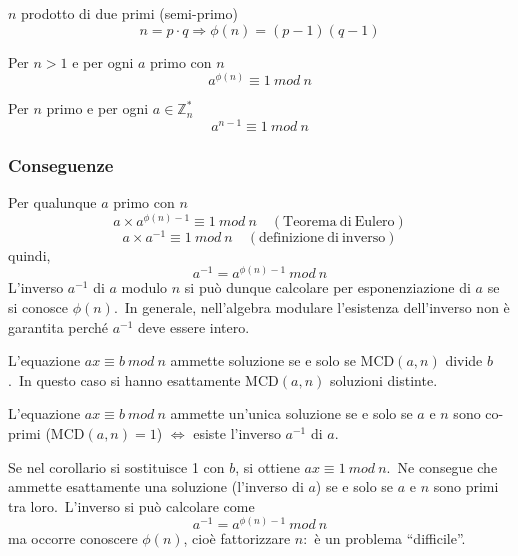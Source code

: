 \begin{theorem}
    $n$ prodotto di due primi (semi-primo)
    \[n = p\cdot q \Rightarrow \phi(n) = (p-1)(q-1)\]
\end{theorem}

\begin{theorem}[Eulero]
    Per $n>1$ e per ogni $a$ primo con $n$
    \[a^{\phi(n)} \equiv 1\ \mathit{mod}\ n\]
\end{theorem}

\begin{theorem}[Fermat]
    Per $n$ primo e per ogni $a \in \mathbb{Z}_n^*$
    \[a^{n-1} \equiv 1\ \mathit{mod}\ n\]
\end{theorem}

\subsubsection{Conseguenze}

Per qualunque $a$ primo con $n$
\[a \times a^{\phi(n)-1}\equiv 1\ \mathit{mod}\ n \quad (\mathrm{Teorema\ di\ Eulero})\]
\[a \times a^{-1}\equiv 1\ \mathit{mod}\ n \quad (\mathrm{definizione\ di\ inverso})\]
quindi,
\[a^{-1} = a^{\phi(n)-1}\ \mathit{mod}\ n \]
L'inverso $a^{-1}$ di $a$ modulo $n$ si può dunque calcolare per esponenziazione di $a$ se si conosce $\phi(n)$.\
In generale, nell'algebra modulare l'esistenza dell'inverso non è garantita perché $a^{-1}$ deve essere intero.\

\begin{theorem}
    L'equazione $ax \equiv b\ \mathit{mod}\ n$ ammette soluzione se e solo se $\mathrm{MCD}(a,n)$ divide $b$.\
    In questo caso si hanno esattamente $\mathrm{MCD}(a,n)$ soluzioni distinte.\
\end{theorem}

\begin{corollario}
    L'equazione $ax \equiv b\ \mathit{mod}\ n$ ammette un'unica soluzione se e solo se $a$ e $n$ sono co-primi ($\mathrm{MCD}(a,n) = 1 $) $\Leftrightarrow$ esiste l'inverso $a^{-1}$ di $a$.\
\end{corollario}

\noindent Se nel corollario si sostituisce 1 con $b$, si ottiene $ax \equiv 1\ \mathit{mod}\ n$.\
Ne consegue che ammette esattamente una soluzione (l'inverso di $a$) se e solo se $a$ e $n$ sono primi tra loro.\
L'inverso si può calcolare come
\[a^{-1} = a^{\phi(n)-1}\ \mathit{mod}\ n \]
ma occorre conoscere $\phi(n)$, cioè fattorizzare $n$:\ è un problema ``difficile''.\

